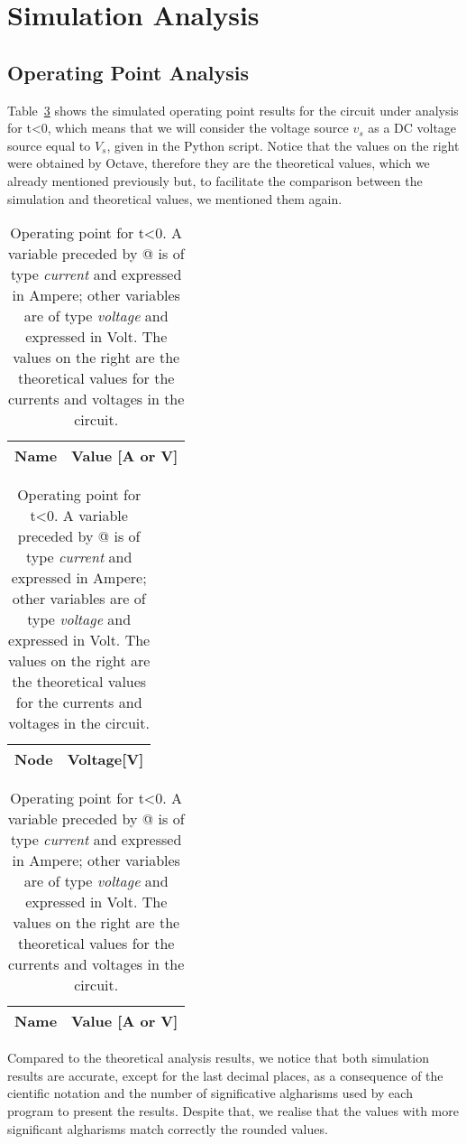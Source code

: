 \section{Simulation Analysis}
\label{sec:simulation}

\subsection{Operating Point Analysis}

	Table~\ref{tab1:op} shows the simulated operating point results for the circuit
under analysis for t<0, which means that we will consider the voltage source $v_s$ as a 
DC voltage source equal to $V_s$, given in the Python script. Notice that the values on the right
were obtained by Octave, therefore they are the theoretical values, which we already mentioned previously 
but, to facilitate the comparison between the simulation and theoretical values, we mentioned them again.

\begin{table}[h]
  \centering
  \begin{tabular}{|l|r|}
    \hline    
    {\bf Name} & {\bf Value [A or V]} \\ \hline
    
  \end{tabular}
  \begin{tabular}{|l|r|}
    \hline    
    {\bf Node} & {\bf Voltage[V]} \\ \hline
    
  \end{tabular}
  \begin{tabular}{|l|r|}
    \hline    
    {\bf Name} & {\bf Value [A or V]} \\ \hline
    
  \end{tabular}
  \caption {Operating point for t<0. A variable preceded by @ is of type {\em current}
    and expressed in Ampere; other variables are of type {\it voltage} and expressed in
    Volt. The values on the right are the theoretical values for the currents and voltages in the circuit.}
  \label{tab1:op}
\end{table}


	Compared to the theoretical analysis results, we notice that both simulation results are accurate, except for the last 
decimal places, as a consequence of the cientific notation and the number of significative algharisms used by each program to 
present the results. Despite that, we realise that the values with more significant algharisms match correctly the rounded values.


